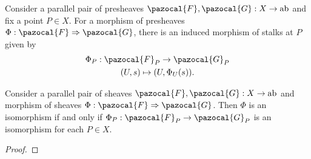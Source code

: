 \begin{definition}
    Consider a parallel pair of presheaves $\pazocal{F},\pazocal{G}: X\rightarrow \mathrm{ab}$ and fix a point $P\in X$. For a morphism of presheaves $\Phi : \pazocal{F}\Rightarrow \pazocal{G}$, there is an induced morphism of stalks at $P$ given by
    \begin{gather*}
        \Phi_P : \pazocal{F}_P \rightarrow \pazocal{G}_P\\
        (U,s) \mapsto (U,\Phi_U(s)). 
    \end{gather*}
\end{definition}
\begin{proposition}
    Consider a parallel pair of sheaves $\pazocal{F},\pazocal{G}: X\rightarrow \mathrm{ab}$ and morphism of sheaves $\Phi: \pazocal{F}\Rightarrow \pazocal{G}$. Then $\Phi$ is an isomorphism if and only if $\Phi_P:\pazocal{F}_P\rightarrow \pazocal{G}_P$ is an isomorphism for each $P\in X$.  
\end{proposition}
\begin{proof}    
\end{proof}

